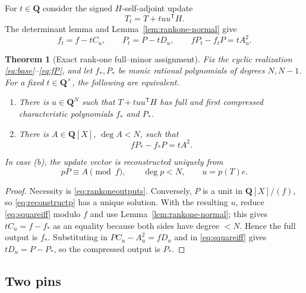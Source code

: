 \documentclass[11pt,reqno]{amsart}
\newtheorem{theorem}{Theorem}[section]
\theoremstyle{definition}
\theoremstyle{remark}
\newcommand{\Q}{\mathbf Q}
\begin{document}
For $t\in\Q$ consider the signed $H$-self-adjoint update
\begin{equation}\label{eq:rankoneupdate}
 T_t=T+tuu^{\mathsf T}H.
\end{equation}
The determinant lemma and Lemma~\ref{lem:rankone-normal} give
\begin{equation}\label{eq:rankoneoutputs}
 f_t=f-tC_u,\qquad P_t=P-tD_u,\qquad
 \boxed{fP_t-f_tP=tA_u^2}.
\end{equation}

\begin{theorem}[Exact rank-one full--minor assignment]\label{thm:rankone-iff}
Fix the cyclic realization \eqref{eq:base}--\eqref{eq:fP}, and let
$f_*,P_*$ be monic rational polynomials of degrees $N,N-1$.  For a fixed
$t\in\Q^\times$, the following are equivalent.
\begin{enumerate}[label=\textup{(\alph*)}]
\item There is $u\in\Q^N$ such that $T+tuu^{\mathsf T}H$ has full and first
compressed characteristic polynomials $f_*$ and $P_*$.
\item There is $A\in\Q[X]$, $\deg A<N$, such that
\begin{equation}\label{eq:squareiff}
 fP_*-f_*P=tA^2.
\end{equation}
\end{enumerate}
In case \textup{(b)}, the update vector is reconstructed uniquely from
\begin{equation}\label{eq:reconstructp}
 pP\equiv A\pmod f,\qquad \deg p<N,\qquad u=p(T)e.
\end{equation}
\end{theorem}

\begin{proof}
Necessity is \eqref{eq:rankoneoutputs}.  Conversely, $P$ is a unit in
$\Q[X]/(f)$, so \eqref{eq:reconstructp} has a unique solution.  With the
resulting $u$, reduce \eqref{eq:squareiff} modulo $f$ and use
Lemma~\ref{lem:rankone-normal}; this gives $tC_u=f-f_*$ as an equality because
both sides have degree $<N$.  Hence the full output is $f_*$.  Substituting
in $PC_u-A_u^2=fD_u$ and in \eqref{eq:squareiff} gives
$tD_u=P-P_*$, so the compressed output is $P_*$.
\end{proof}

\subsection{Two pins}
\end{document}
